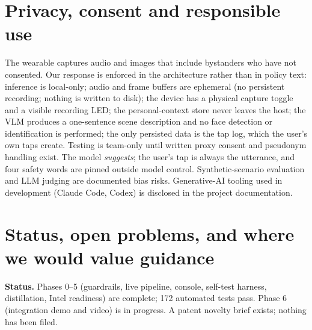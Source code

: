 \documentclass[11pt]{article}
\begin{document}
\section{Privacy, consent and responsible use}
\label{sec:privacy}
The wearable captures audio and images that include bystanders who have not
consented. Our response is enforced in the architecture rather than in policy
text: inference is local-only; audio and frame buffers are ephemeral (no
persistent recording; nothing is written to disk); the device has a physical
capture toggle and a visible recording LED; the personal-context store never
leaves the host; the VLM produces a one-sentence scene description and no face
detection or identification is performed; the only persisted data is the tap
log, which the user's own taps create. Testing is team-only until written proxy
consent and pseudonym handling exist. The model \emph{suggests}; the user's tap
is always the utterance, and four safety words are pinned outside model
control. Synthetic-scenario evaluation and LLM judging are documented bias
risks. Generative-AI tooling used in development (Claude Code, Codex) is
disclosed in the project documentation.

\section{Status, open problems, and where we would value guidance}
\textbf{Status.} Phases 0--5 (guardrails, live pipeline, console, self-test
harness, distillation, Intel readiness) are complete; 172 automated tests pass.
Phase 6 (integration demo and video) is in progress. A patent novelty brief
exists; nothing has been filed.
\end{document}
